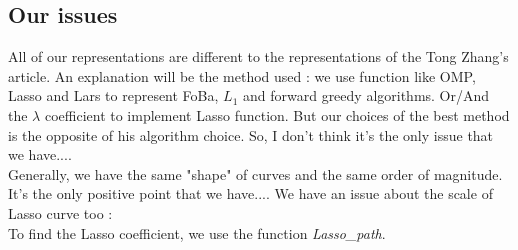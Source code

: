 \documentclass{article}
\begin{document}
\subsection{Our issues}
All of our representations are different to the representations of the Tong Zhang's article. An explanation will be the method used : we use function like OMP, Lasso and Lars to represent FoBa, $L_1$ and forward greedy algorithms. Or/And the $\lambda$ coefficient to implement Lasso function. But our choices of the best method is the opposite of his algorithm choice. So, I don't think it's the only issue that we have....\\
Generally, we have the same "shape" of curves and the same order of magnitude. It's the only positive point that we have....
We have an issue about the scale of Lasso curve too : \\
To find the Lasso coefficient, we use the function \textit{Lasso\_path}.
\end{document}
